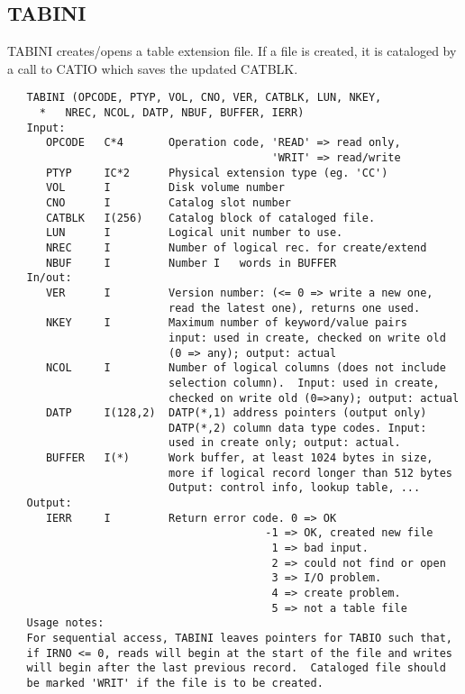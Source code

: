 \subsection{TABINI}
TABINI creates/opens a table extension file.  If a file is created,
it is cataloged by a call to CATIO which saves the updated CATBLK.
\begin{verbatim}
   TABINI (OPCODE, PTYP, VOL, CNO, VER, CATBLK, LUN, NKEY,
     *   NREC, NCOL, DATP, NBUF, BUFFER, IERR)
   Input:
      OPCODE   C*4       Operation code, 'READ' => read only,
                                         'WRIT' => read/write
      PTYP     IC*2      Physical extension type (eg. 'CC')
      VOL      I         Disk volume number
      CNO      I         Catalog slot number
      CATBLK   I(256)    Catalog block of cataloged file.
      LUN      I         Logical unit number to use.
      NREC     I         Number of logical rec. for create/extend
      NBUF     I         Number I   words in BUFFER
   In/out:
      VER      I         Version number: (<= 0 => write a new one,
                         read the latest one), returns one used.
      NKEY     I         Maximum number of keyword/value pairs
                         input: used in create, checked on write old
                         (0 => any); output: actual
      NCOL     I         Number of logical columns (does not include
                         selection column).  Input: used in create,
                         checked on write old (0=>any); output: actual
      DATP     I(128,2)  DATP(*,1) address pointers (output only)
                         DATP(*,2) column data type codes. Input:
                         used in create only; output: actual.
      BUFFER   I(*)      Work buffer, at least 1024 bytes in size,
                         more if logical record longer than 512 bytes
                         Output: control info, lookup table, ...
   Output:
      IERR     I         Return error code. 0 => OK
                                        -1 => OK, created new file
                                         1 => bad input.
                                         2 => could not find or open
                                         3 => I/O problem.
                                         4 => create problem.
                                         5 => not a table file
   Usage notes:
   For sequential access, TABINI leaves pointers for TABIO such that,
   if IRNO <= 0, reads will begin at the start of the file and writes
   will begin after the last previous record.  Cataloged file should
   be marked 'WRIT' if the file is to be created.


\end{verbatim}
